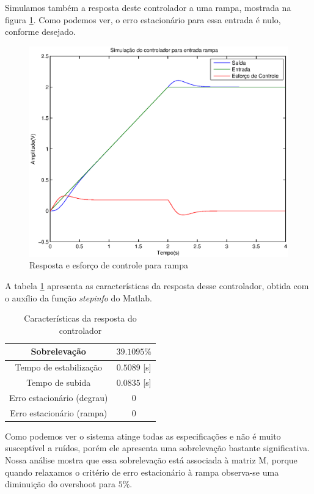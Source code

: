 \documentclass{article}
\begin{document}
Simulamos também a resposta deste controlador a uma rampa, mostrada na figura \ref{fig:yurR}. Como podemos ver, o erro estacionário para essa entrada é nulo, conforme desejado.
\begin{figure}[H]
	\centering
	\includegraphics[width=0.8\linewidth]{../yurR}
	\caption{Resposta e esforço de controle para rampa}
	\label{fig:yurR}
\end{figure}
A tabela \ref{tab:stepinfo} apresenta as características da resposta desse controlador, obtida com o auxílio da função \textit{stepinfo} do Matlab.
\begin{table}[H]
	\centering
	\caption{Características da resposta do controlador}
	\label{tab:stepinfo}
	\begin{tabular}{|c|c|}
		\hline Sobrelevação 				& $39.1095\%$ \\ 
		\hline Tempo de estabilização 		& $0.5089$ [s]\\ 
		\hline Tempo de subida				& $0.0835$ [s]\\ 
		\hline Erro estacionário (degrau) 	& $0$\\ 
		\hline Erro estacionário (rampa) 	& $0$\\ 
		\hline 
	\end{tabular} 
\end{table}

Como podemos ver o sistema atinge todas as especificações e não é muito susceptível a ruídos, porém ele apresenta uma sobrelevação bastante significativa. Nossa análise mostra que essa sobrelevação está associada à matriz M, porque quando relaxamos o critério de erro estacionário à rampa observa-se uma diminuição do overshoot para $5\%$.
\end{document}

